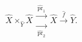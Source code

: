 \(
\widehat X\times_{\widehat Y}\widehat X
\mathrel{\substack{\xrightarrow{\ \widehat{\operatorname{pr}}_1\ }\\[-.7ex]
                   \xrightarrow[\ \widehat{\operatorname{pr}}_2\ ]{}}}
\widehat X\xrightarrow{\ \widehat f\ }\widehat Y.
\)
